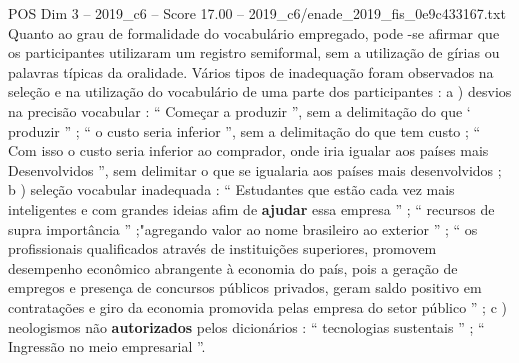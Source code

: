 \begin{textsample}{POS Dim 3 – 2019\_c6 – Score 17.00 – 2019\_c6/enade\_2019\_fis\_0e9c433167.txt}
Quanto ao grau de formalidade do vocabulário empregado, pode -se afirmar que os participantes utilizaram um registro semiformal, sem a utilização de gírias ou palavras típicas da oralidade.
Vários tipos de inadequação foram observados na seleção e na utilização do vocabulário de uma parte dos participantes : a ) desvios na precisão vocabular : “ Começar a produzir ”, sem a delimitação do que ‘ produzir ” ; “ o custo seria inferior ”, sem a delimitação do que tem custo ; “ Com isso o custo seria inferior ao comprador, onde iria igualar aos países mais Desenvolvidos ”, sem delimitar o que se igualaria aos países mais desenvolvidos ; b ) seleção vocabular inadequada : “ Estudantes que estão cada vez mais inteligentes e com grandes ideias afim de \textbf{ajudar} essa empresa ” ; “ recursos de supra importância ” ;"agregando valor ao nome brasileiro ao exterior ” ; “ os profissionais qualificados através de instituições superiores, promovem desempenho econômico abrangente à economia do país, pois a geração de empregos e presença de concursos públicos privados, geram saldo positivo em contratações e giro da economia promovida pelas empresa do setor público ” ; c ) neologismos não \textbf{autorizados} pelos dicionários : “ tecnologias sustentais ” ; “ Ingressão no meio empresarial ”.

\end{textsample}
